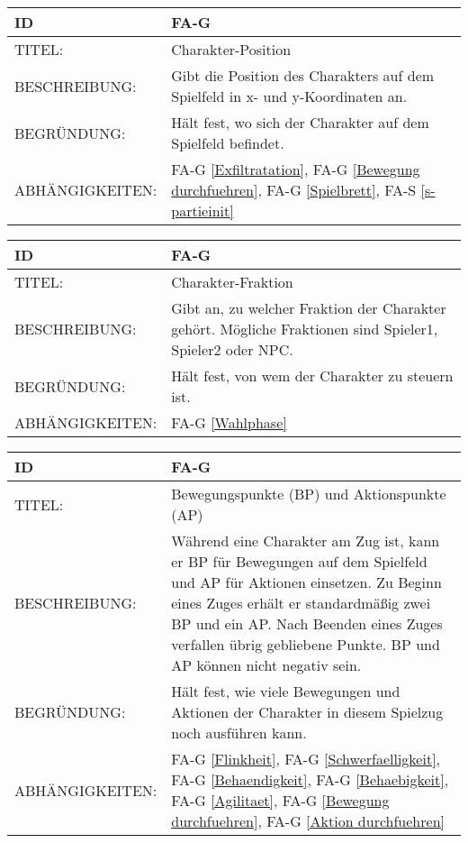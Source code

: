 \begin{tabularx}{16cm}{l|X}
	{table}\label{Charakter-Position}
	\textbf{ID} & \textbf{FA-G \arabic{table}} \\
	\hline
	TITEL: & Charakter-Position \\
	\hline
	BESCHREIBUNG: & Gibt die Position des Charakters auf dem Spielfeld in x- und y-Koordinaten an.\\
	\hline
	BEGRÜNDUNG: & Hält fest, wo sich der Charakter auf dem Spielfeld befindet.\\
	\hline
	ABHÄNGIGKEITEN: & FA-G \ref{Exfiltratation}, FA-G \ref{Bewegung durchfuehren}, FA-G \ref{Spielbrett}, FA-S \ref{s-partieinit}\\
\end{tabularx}

\begin{tabularx}{16cm}{l|X}
	{table}\label{Charakter-Fraktion}
	\textbf{ID} & \textbf{FA-G \arabic{table}} \\
	\hline
	TITEL: & Charakter-Fraktion \\
	\hline
	BESCHREIBUNG: & Gibt an, zu welcher Fraktion der Charakter gehört. Mögliche Fraktionen sind Spieler1, Spieler2 oder NPC.\\
	\hline
	BEGRÜNDUNG: & Hält fest, von wem der Charakter zu steuern ist.\\
	\hline
	ABHÄNGIGKEITEN: & FA-G \ref{Wahlphase}\\
\end{tabularx}

\begin{tabularx}{16cm}{l|X}
	{table}\label{BP und AP}
	\textbf{ID} & \textbf{FA-G \arabic{table}} \\
	\hline
	TITEL: & Bewegungspunkte (BP) und Aktionspunkte (AP) \\
	\hline
	BESCHREIBUNG: & Während eine Charakter am Zug ist, kann er BP für Bewegungen auf dem Spielfeld und AP für Aktionen einsetzen.
	Zu Beginn eines Zuges erhält er standardmäßig zwei BP und ein AP. Nach Beenden eines Zuges verfallen übrig gebliebene Punkte. BP und AP können nicht negativ sein.\\
	\hline
	BEGRÜNDUNG: & Hält fest, wie viele Bewegungen und Aktionen der Charakter in diesem Spielzug noch ausführen kann. \\
	\hline
	ABHÄNGIGKEITEN: & FA-G \ref{Flinkheit}, FA-G \ref{Schwerfaelligkeit}, FA-G \ref{Behaendigkeit}, FA-G \ref{Behaebigkeit}, FA-G \ref{Agilitaet}, FA-G \ref{Bewegung durchfuehren}, FA-G \ref{Aktion durchfuehren}\\
\end{tabularx}

